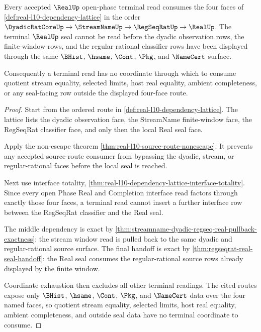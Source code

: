 \begin{theorem}
\label{thm:real-l10-terminal-face-order}
Every accepted $\RealUp$ open-phase terminal read consumes the four faces of
\autoref{def:real-l10-dependency-lattice} in the order
$\DyadicRatCoreUp \to \StreamNameUp \to \RegSeqRatUp \to \RealUp$. The
terminal $\RealUp$ seal cannot be read before the dyadic observation rows, the
finite-window rows, and the regular-rational classifier rows have been
displayed through the same $\BHist$, $\hsame$, $\Cont$, $\Pkg$, and
$\NameCert$ surface.

Consequently a terminal read has no coordinate through which to consume
quotient stream equality, selected limits, host real equality, ambient
completeness, or any seal-facing row outside the displayed four-face route.
\end{theorem}
\begin{proof}
Start from the ordered route in \autoref{def:real-l10-dependency-lattice}.
The lattice lists the dyadic observation face, the StreamName finite-window
face, the RegSeqRat classifier face, and only then the local Real seal face.

Apply the non-escape theorem
\autoref{thm:real-l10-source-route-nonescape}. It prevents any accepted
source-route consumer from bypassing the dyadic, stream, or regular-rational
faces before the local seal is reached.

Next use interface totality,
\autoref{thm:real-l10-dependency-lattice-interface-totality}. Since every
open Phase Real and Completion interface read factors through exactly those
four faces, a terminal read cannot insert a further interface row between the
RegSeqRat classifier and the Real seal.

The middle dependency is exact by
\autoref{thm:streamname-dyadic-regseq-real-pullback-exactness}: the stream
window read is pulled back to the same dyadic and regular-rational source
surface. The final handoff is exact by
\autoref{thm:regseqrat-real-seal-handoff}: the Real seal consumes the
regular-rational source rows already displayed by the finite window.

Coordinate exhaustion then excludes all other terminal readings. The cited
routes expose only $\BHist$, $\hsame$, $\Cont$, $\Pkg$, and $\NameCert$ data
over the four named faces, so quotient stream equality, selected limits, host
real equality, ambient completeness, and outside seal data have no terminal
coordinate to consume.
\end{proof}

